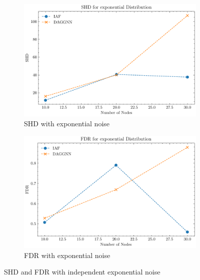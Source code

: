 \documentclass[10pt]{article}
\begin{document}
\begin{figure}[H]
    \centering
    \begin{subfigure}{0.45\textwidth}
        \includegraphics[width=\textwidth]{fig/SHD_independence_exponential.pdf}
        \caption{SHD with exponential noise}
        \label{SHD_exponential}
    \end{subfigure}
    \hfill
    \begin{subfigure}{0.45\textwidth}
        \includegraphics[width=\textwidth]{fig/FDR_independence_exponential.pdf}
        \caption{FDR with exponential noise}
        \label{FDR_exponential}
    \end{subfigure}
    \caption{SHD and FDR with independent exponential noise}
    \label{SHD_FDR_exponential}
\end{figure}
\end{document}
